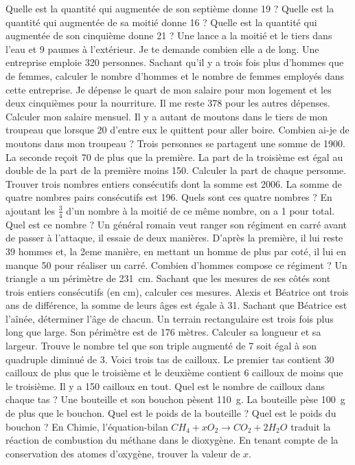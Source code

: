 \documentclass["../Cours.tex"]{subfiles}
\begin{document}
\begin{questions}
    \exercice Quelle est la quantité qui augmentée de son septième donne 19 ?
    \exercice Quelle est la quantité qui augmentée de sa moitié donne 16 ? 
    \exercice Quelle est la quantité qui augmentée de son cinquième donne 21 ?
    \exercice Une lance a la moitié et le tiers dans l'eau et 9 paumes à l'extérieur. Je te demande combien elle a de long.
    \exercice Une entreprise emploie 320 personnes. Sachant qu'il y a trois fois plus d'hommes que de femmes, calculer le nombre d'hommes et le nombre de femmes employés dans cette entreprise.
    \exercice Je dépense le quart de mon salaire pour mon logement et les deux cinquièmes pour la nourriture. Il me reste \qty{378}{\EURO} pour les autres dépenses. Calculer mon salaire mensuel.
    \exercice Il y a autant de moutons dans le tiers de mon troupeau que lorsque 20 d'entre eux le quittent pour aller boire. Combien ai-je de moutons dans mon troupeau ?
    \exercice Trois personnes se partagent une somme de \qty{1900}{\EURO}. La seconde reçoit \qty{70}{\EURO} de plus que la première. La part de la troisième est égal au double de la part de la première moins \qty{150}{\EURO}. Calculer la part de chaque personne.
    \exercice Trouver trois nombres entiers consécutifs dont la somme est 2006.
    \exercice La somme de quatre nombres pairs consécutifs est 196. Quels sont ces quatre nombres ?
    \exercice En ajoutant les $\frac{3}{4}$ d'un nombre à la moitié de ce même nombre, on a 1 pour total. Quel est ce nombre ?
    \exercice Un général romain veut ranger son régiment en carré avant de passer à l'attaque, il essaie de deux manières. D'après la première, il lui reste 39 hommes et, la 2eme manière, en mettant un homme de plus par coté, il lui en manque 50 pour réaliser un carré. Combien d'hommes compose ce régiment ?
    \exercice Un triangle a un périmètre de \qty{231}{\centi\metre}. Sachant que les mesures de ses côtés sont trois entiers consécutifs (en \unit{\centi\metre}), calculer ces mesures.
    \exercice Alexis et Béatrice ont trois ans de différence, la somme de leurs âges est égale à 31. Sachant que Béatrice est l’aînée, déterminer l’âge de chacun.
    \exercice Un terrain rectangulaire est trois fois plus long que large. Son périmètre est de 176 mètres. Calculer sa longueur et sa largeur.
    \exercice Trouve le nombre tel que son triple augmenté de 7 soit égal à son quadruple diminué de 3.
    \exercice Voici trois tas de cailloux. Le premier tas contient 30 cailloux de plus que le troisième et le deuxième contient 6 cailloux de moins que le troisième. Il y a 150 cailloux en tout. Quel est le nombre de cailloux dans chaque tas ?
    \exercice Une bouteille et son bouchon pèsent \qty{110}{\gram}. La bouteille pèse \qty{100}{\gram} de plus que le bouchon. Quel est le poids de la bouteille ? Quel est le poids du bouchon ?
    \exercice En Chimie, l'équation-bilan $CH_4 + x O_2 \longrightarrow CO_2 + 2 H_2O$ traduit la réaction de combustion du méthane dans le dioxygène. En tenant compte de la conservation des atomes d'oxygène, trouver la valeur de $x$.


\end{questions}
\end{document}
